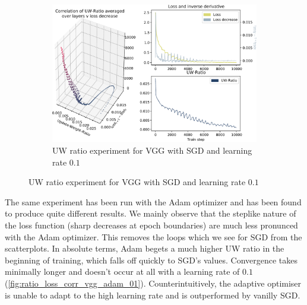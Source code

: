 \begin{figure}
    \begin{subfigure}{\textwidth}
        \centering
        \includegraphics[width=\linewidth]{gfx/diagrams/experiments/ratio_loss_correlation/vgg_sgd_01_0_10000.pdf}
        \caption{UW ratio experiment for VGG with SGD and learning rate $0.1$}
        \label{fig:ratio_loss_corr_vgg_sgd_01}
    \end{subfigure}
\end{figure}

The same experiment has been run with the Adam optimizer \citep{kingma2014adam}
and has been found to produce quite different results. We mainly observe that
the steplike nature of the loss function (sharp decreases at epoch boundaries)
are much less pronunced with the Adam optimizer. This removes the loops  which we see for
SGD from the scatterplots. In absolute terms, Adam begets a much higher UW ratio
in the beginning of training, which falls off quickly to SGD's values.
Convergence takes minimally longer and doesn't occur at all with a learning rate
of $0.1$ (\cref{fig:ratio_loss_corr_vgg_adam_01}). Counterintuitively, the
adaptive optimiser is unable to adapt to the high learning rate and is
outperformed by vanilly SGD.

